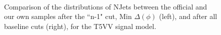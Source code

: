 \begin{figure}
        \centering
        \hspace{-1 cm}
        ~ %
        \caption{Comparison of the distributions of NJets between the official and our own samples after the ``n-1" cut, Min $\Delta(\phi)$ (left), and after all baseline cuts (right), for the T5VV signal model.}\label{fig:animals}
\end{figure}        
        
